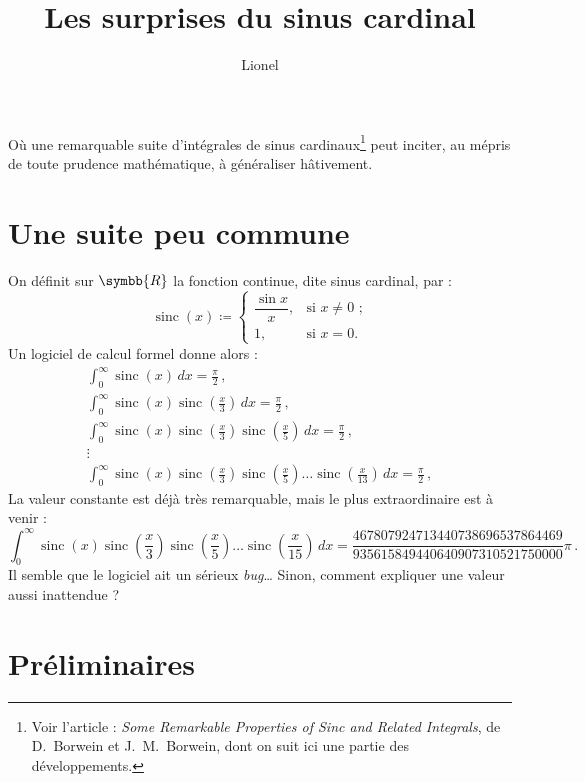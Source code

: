 \documentclass[a4paper,11pt]{article}
\title{Les surprises du sinus cardinal}
\author{Lionel \bsc{V\kern-1pt idal}}
\renewenvironment{abstract}%
  {\quotation\noindent\ignorespaces}%
  {\endquotation}
\newcommand{\R}{\ensuremath{\symbb{R}}\xspace}
\DeclareMathOperator{\sinc}{sinc}
\begin{document}
\maketitle
\begin{abstract}
  Où une remarquable suite d'intégrales de sinus cardinaux\footnote{%
    Voir l'article : {\slshape Some Remarkable Properties of Sinc and
    Related Integrals}, de D.~Borwein et J.~M.~Borwein, dont on suit ici
    une partie des développements.}
  peut inciter, au mépris de toute prudence mathématique, à généraliser
  hâtivement.
\end{abstract}

\section{Une suite peu commune}

On définit sur \R la fonction continue, dite sinus cardinal, par :
\[
  \sinc(x) \coloneq
  \begin{cases}
    \dfrac{\sin x}{x}, & \text{si $x\neq 0$ ;} \\
    1,                & \text{si $x=0$.}
  \end{cases}
\]
Un logiciel de calcul formel donne alors :
\begin{gather*}
  \int_0^\infty \sinc(x)\,dx
    = \frac{\pi}{2} \,, \\
  \int_0^\infty \sinc(x)\sinc\left(\frac{x}{3}\right)\,dx
    = \frac{\pi}{2} \,, \\
  \int_0^\infty \sinc(x)\sinc\left(\frac{x}{3}\right)
    \sinc\left(\frac{x}{5}\right)\,dx
    = \frac{\pi}{2} \,, \\
  \vdots \\
  \int_0^\infty \sinc(x)\sinc\left(\frac{x}{3}\right)
    \sinc\left(\frac{x}{5}\right)\ldots
    \sinc\left(\frac{x}{13}\right)\,dx
    = \frac{\pi}{2} \,,
\end{gather*}
La valeur constante est déjà très remarquable, mais le plus
extraordinaire est à venir :
\[
  \int_0^\infty \sinc(x)\sinc\left(\frac{x}{3}\right)
    \sinc\left(\frac{x}{5}\right)\ldots
    \sinc\left(\frac{x}{15}\right)\,dx
  = \frac{467807924713440738696537864469}{935615849440640907310521750000}
    \pi \,.
\]
Il semble que le logiciel ait un sérieux {\it bug}\dots{}
Sinon, comment expliquer une valeur aussi inattendue ?

\section{Préliminaires}
\end{document}
